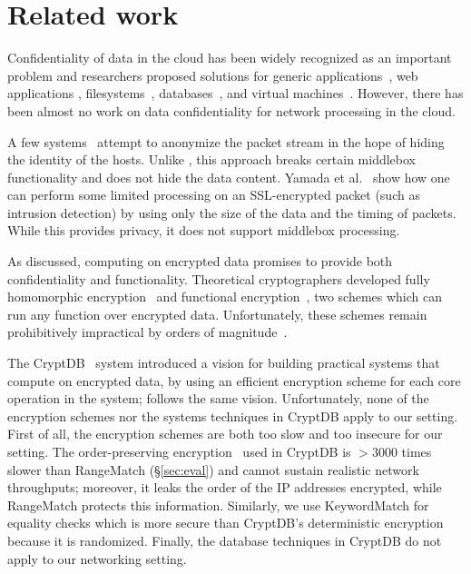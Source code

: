 
\section{Related work}\label{sec:related}



Confidentiality of data in the cloud has been widely recognized as an important problem and researchers proposed solutions for generic applications~\cite{Baumann:Haven}, web applications \cite{giffin:hails, Mylar},  filesystems~\cite{blaze:cfs, kallahalla:plutus, goh:sirius},  databases~\cite{popa:cryptdb},  and virtual machines~\cite{Zhang:CloudVisor}. However, there has been almost no work on data confidentiality for network processing in the cloud. 

A few systems~\cite{Vern:Anonymize03, Vern:Anonymize06} attempt to anonymize the packet stream in the hope of hiding the identity of the hosts.
Unlike \sys, this approach breaks certain middlebox functionality and does not hide the data content.
Yamada et al.~\cite{Yamada_IDS} show how one can perform some limited processing on an 
SSL-encrypted packet (such as intrusion detection)  
     by using only the size of the data and the timing of packets. While this provides privacy, it does not 
     support middlebox processing. 


As discussed, computing on encrypted data promises to provide both confidentiality and functionality. Theoretical cryptographers developed fully homomorphic encryption~\cite{gentry:fhe, gentry:fhe-aes-eprint} and functional encryption~\cite{BSW11}, two schemes which can run any function over encrypted data. Unfortunately, these schemes remain prohibitively impractical by orders of magnitude~\cite{gentry:fhe-aes-eprint}.

The CryptDB~\cite{popa:cryptdb} system introduced a vision for building practical systems that compute on encrypted data, by using an efficient encryption scheme for each core operation in the system; \sys follows the same  vision. Unfortunately, none of the encryption schemes nor the systems techniques in CryptDB apply to our setting. First of all, the encryption schemes are both too slow and too insecure for our setting. The order-preserving encryption~\cite{boldyreva:ope} used in CryptDB is 
 $>3000$ times slower than RangeMatch (\S\ref{sec:eval}) and cannot sustain realistic network throughputs; moreover, it leaks the order of the IP addresses encrypted, while RangeMatch protects this information. Similarly, we use KeywordMatch for equality checks which is more secure than CryptDB's deterministic encryption because it is randomized. Finally, the database techniques in CryptDB do not apply to our networking setting. 

